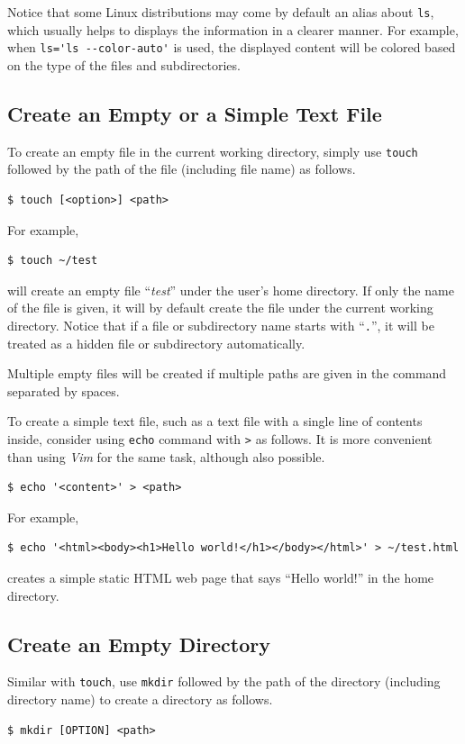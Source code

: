Notice that some Linux distributions may come by default an alias about \verb|ls|, which usually helps to displays the information in a clearer manner. For example, when \verb|ls='ls --color-auto'| is used, the displayed content will be colored based on the type of the files and subdirectories.

\subsection{Create an Empty or a Simple Text File}

To create an empty file in the current working directory, simply use \verb|touch| followed by the path of the file (including file name) as follows.
\begin{lstlisting}
$ touch [<option>] <path>
\end{lstlisting}
For example,
\begin{lstlisting}
$ touch ~/test
\end{lstlisting}
will create an empty file ``\textit{test}'' under the user's home directory. If only the name of the file is given, it will by default create the file under the current working directory. Notice that if a file or subdirectory name starts with ``\verb|.|'', it will be treated as a hidden file or subdirectory automatically.

Multiple empty files will be created if multiple paths are given in the command separated by spaces.

To create a simple text file, such as a text file with a single line of contents inside, consider using \verb|echo| command with \verb|>| as follows. It is more convenient than using \textit{Vim} for the same task, although also possible.
\begin{lstlisting}
$ echo '<content>' > <path>
\end{lstlisting}
For example,
\begin{lstlisting}
$ echo '<html><body><h1>Hello world!</h1></body></html>' > ~/test.html
\end{lstlisting}
creates a simple static HTML web page that says ``Hello world!'' in the home directory.

\subsection{Create an Empty Directory}

Similar with \verb|touch|, use \verb|mkdir| followed by the path of the directory (including directory name) to create a directory as follows.
\begin{lstlisting}
$ mkdir [OPTION] <path>
\end{lstlisting}


